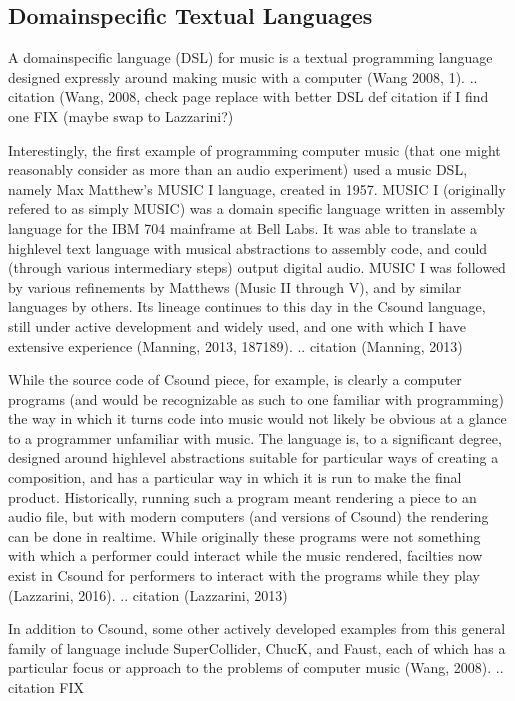 \documentclass[letterpaper,10pt,english]{sphinxmanual}
\begin{document}
\subsection{Domain\sphinxhyphen{}specific Textual Languages}
\label{\detokenize{background:domain-specific-textual-languages}}
\sphinxAtStartPar
A domain\sphinxhyphen{}specific language (DSL) for music is a textual programming language designed
expressly around making music with a computer (Wang 2008, 1).
.. citation (Wang, 2008, check page \sphinxhyphen{} replace with better DSL def citation if I find one FIX  (maybe swap to Lazzarini?)

\sphinxAtStartPar
Interestingly, the first example of programming computer music (that one might reasonably
consider as more than an audio experiment) used a music DSL, namely Max Matthew’s MUSIC I
language, created in 1957.
MUSIC I (originally refered to as simply MUSIC) was a domain specific language written in assembly
language for the IBM 704 mainframe at Bell Labs.
It was able to translate a high\sphinxhyphen{}level text language with musical abstractions to assembly code,
and could (through various intermediary steps) output digital audio.
MUSIC I was followed by various refinements by Matthews (Music II through V),
and by similar languages by others.
Its lineage continues to this day in the Csound language, still under active development and widely used,
and one with which I have extensive experience (Manning, 2013, 187\sphinxhyphen{}189).
.. citation (Manning, 2013)

\sphinxAtStartPar
While the source code of Csound piece, for example, is clearly a computer programs
(and would be recognizable as such to one familiar with programming)
the way in which it turns code into music would not likely be obvious at a glance to a programmer unfamiliar with music.
The language is, to a significant degree, designed around high\sphinxhyphen{}level abstractions suitable for particular ways
of creating a composition, and has a particular way in which it is run to make the final product.
Historically, running such a program meant rendering a piece to an audio file, but
with modern computers (and versions of Csound) the rendering can be done in realtime.
While originally these programs were not something with which a performer could interact while the music rendered,
facilties now exist in Csound for performers to interact with the programs while they play (Lazzarini, 2016).
.. citation (Lazzarini, 2013)

\sphinxAtStartPar
In addition to Csound, some other actively developed examples from this general family of language
include SuperCollider, ChucK, and Faust, each of which has a particular focus or approach to the problems
of computer music (Wang, 2008).
.. citation FIX
\end{document}
